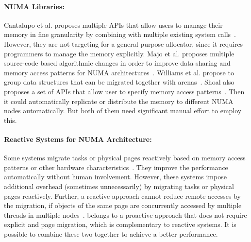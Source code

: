 \paragraph{NUMA Libraries:}
Cantalupo et al. proposes multiple APIs that allow users to manage their memory in fine granularity by combining with multiple existing system calls~\cite{cantalupo2015memkind}. However, they are not targeting for a general purpose allocator, since it requires programmers to manage the memory explicitly.  Majo et al. proposes multiple source-code based  algorithmic changes in order to improve  data sharing and  memory access patterns for NUMA architectures~\cite{6704666}. Williams et al. propose to group data structures that can be migrated together with arenas~\cite{WilliamsI0L18}. 
Shoal also proposes a set of APIs that allow user to specify memory access patterns~\cite{Kaestle:2015:SSA:2813767.2813787}. Then it could automatically replicate or distribute the memory  to different NUMA nodes automatically. But both of them need significant manual effort to employ this. 

\paragraph{Reactive Systems for NUMA Architecture:} Some systems migrate tasks or physical pages reactively based on memory access patterns or other hardware characteristics~\cite{Blagodurov:2011:CNC:2002181.2002182, AutoNUMA, Dashti:2013:TMH:2451116.2451157, Lepers:2015:TMP:2813767.2813788}. They improve the performance automatically without human involvement. However, these systems impose additional overhead (sometimes unnecessarily)  by migrating tasks or physical pages reactively. Further, a reactive approach cannot reduce remote accesses by the migration, if objects of the same page are concurrently accessed by multiple threads in multiple nodes~\cite{Gaud:2014:LPM:2643634.2643659}. \NM{} belongs to a proactive approach that does not require explicit and page migration, which is complementary to reactive systems. It is possible to combine these two together to achieve a better performance. 

